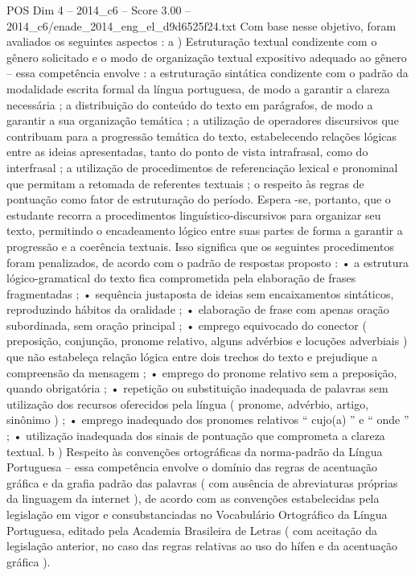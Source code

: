 \begin{textsample}{POS Dim 4 – 2014\_c6 – Score 3.00 – 2014\_c6/enade\_2014\_eng\_el\_d9d6525f24.txt}
Com base nesse objetivo, foram avaliados os seguintes aspectos : a ) Estruturação textual condizente com o gênero solicitado e o modo de organização textual expositivo adequado ao gênero – essa competência envolve : a estruturação sintática condizente com o padrão da modalidade escrita formal da língua portuguesa, de modo a garantir a clareza necessária ; a distribuição do conteúdo do texto em parágrafos, de modo a garantir a sua organização temática ; a utilização de operadores discursivos que contribuam para a progressão temática do texto, estabelecendo relações lógicas entre as ideias apresentadas, tanto do ponto de vista intrafrasal, como do interfrasal ; a utilização de procedimentos de referenciação lexical e pronominal que permitam a retomada de referentes textuais ; o respeito às regras de pontuação como fator de estruturação do período.
Espera -se, portanto, que o estudante recorra a procedimentos linguístico-discursivos para organizar seu texto, permitindo o encadeamento lógico entre suas partes de forma a garantir a progressão e a coerência textuais.
Isso significa que os seguintes procedimentos foram penalizados, de acordo com o padrão de respostas proposto : • a estrutura lógico-gramatical do texto fica comprometida pela elaboração de frases fragmentadas ; • sequência justaposta de ideias sem encaixamentos sintáticos, reproduzindo hábitos da oralidade ; • elaboração de frase com apenas oração subordinada, sem oração principal ; • emprego equivocado do conector ( preposição, conjunção, pronome relativo, alguns advérbios e locuções adverbiais ) que não estabeleça relação lógica entre dois trechos do texto e prejudique a compreensão da mensagem ; • emprego do pronome relativo sem a preposição, quando obrigatória ; • repetição ou substituição inadequada de palavras sem utilização dos recursos oferecidos pela língua ( pronome, advérbio, artigo, sinônimo ) ; • emprego inadequado dos pronomes relativos “ cujo(a) ” e “ onde ” ; • utilização inadequada dos sinais de pontuação que comprometa a clareza textual. b ) Respeito às convenções ortográficas da norma-padrão da Língua Portuguesa – essa competência envolve o domínio das regras de acentuação gráfica e da grafia padrão das palavras ( com ausência de abreviaturas próprias da linguagem da internet ), de acordo com as convenções estabelecidas pela legislação em vigor e consubstanciadas no Vocabulário Ortográfico da Língua Portuguesa, editado pela Academia Brasileira de Letras ( com aceitação da legislação anterior, no caso das regras relativas ao uso do hífen e da acentuação gráfica ).

\end{textsample}
